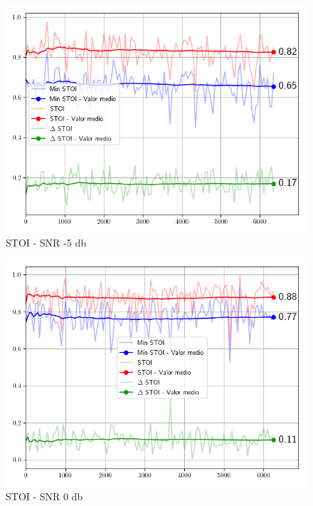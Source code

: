 \begin{figure}
	\centering
	\centerline{\includegraphics[scale=0.75]{images/ch6/af/objective_metrics/metric_STOI_-5db.png}}
	\caption{STOI - SNR -5 db}		\label{fig:ch6_stoi_minus_five_db}
\end{figure}

\begin{figure}
	\centering
	\centerline{\includegraphics[scale=0.75]{images/ch6/af/objective_metrics/metric_STOI_0db.png}}
	\caption{STOI - SNR 0 db}
	\label{fig:ch6_stoi_cero_db}
\end{figure}

